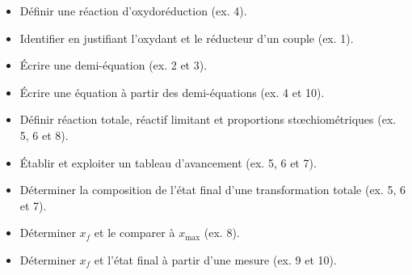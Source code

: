 \documentclass[11pt,a4paper]{article}
\begin{document}
\vfill
\begin{tcolorbox}[colback=bleu!6,colframe=bleu,boxrule=0.6pt,arc=2pt,fonttitle=\bfseries,title={Avant le DS : suis-je capable de\dots{} ?}]
\renewcommand{\labelitemi}{$\square$}
\begin{itemize}
  \item Définir une réaction d'oxydoréduction (ex. 4).
  \item Identifier en justifiant l'oxydant et le réducteur d'un couple (ex. 1).
  \item Écrire une demi-équation (ex. 2 et 3).
  \item Écrire une équation à partir des demi-équations (ex. 4 et 10).
  \item Définir réaction totale, réactif limitant et proportions stœchiométriques (ex. 5, 6 et 8).
  \item Établir et exploiter un tableau d'avancement (ex. 5, 6 et 7).
  \item Déterminer la composition de l'état final d'une transformation totale (ex. 5, 6 et 7).
  \item Déterminer $x_f$ et le comparer à $x_{\max}$ (ex. 8).
  \item Déterminer $x_f$ et l'état final à partir d'une mesure (ex. 9 et 10).
\end{itemize}
\end{tcolorbox}
\end{document}
